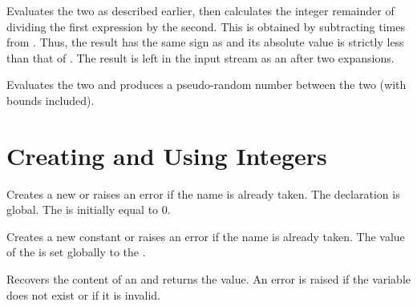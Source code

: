 \documentclass[oneside]{book}
\begin{document}
\begin{function}{\IntMathMod}
\begin{syntax}
  
\end{syntax}
Evaluates the two  as described earlier,
then calculates the integer remainder of dividing the first
expression by the second.  This is obtained by subtracting
   times
 from .  Thus, the result has the
same sign as  and its absolute value is strictly
less than that of .  The result is left in the input
stream as an  after two expansions.
\end{function}

\begin{function}{\IntMathRand}
\begin{syntax}
  
\end{syntax}
Evaluates the two  and produces a
pseudo-random number between the two (with bounds included).
\end{function}

\section{Creating and Using Integers}

\begin{function}{\IntNew}
\begin{syntax}
 
\end{syntax}
Creates a new  or raises an error if the name is
already taken. The declaration is global. The  is
initially equal to $0$.
\end{function}

\begin{function}{\IntConst}
\begin{syntax}
  
\end{syntax}
Creates a new constant  or raises an error if the name
is already taken. The value of the  is set
globally to the .
\end{function}

\begin{function}{\IntUse}
\begin{syntax}
 
\end{syntax}
Recovers the content of an  and returns the value.
An error is raised if the variable does not exist or if it is invalid.
\end{function}
\end{document}
